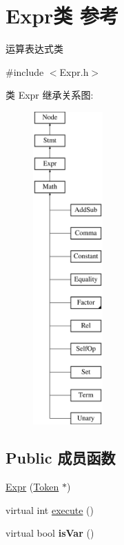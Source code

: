 \hypertarget{class_expr}{}\section{Expr类 参考}
\label{class_expr}


运算表达式类  




{\ttfamily \#include $<$Expr.\+h$>$}

类 Expr 继承关系图\+:\begin{figure}[H]
\begin{center}
\leavevmode
\includegraphics[height=12.000000cm]{class_expr}
\end{center}
\end{figure}
\subsection*{Public 成员函数}
\begin{DoxyCompactItemize}
\item 
\hyperlink{class_expr_a5a045d68e601c2e782e1958d55a07400}{Expr} (\hyperlink{class_token}{Token} $\ast$)
\item 
virtual int \hyperlink{class_expr_aff6a2e6eaa460e2a3db28ebdab089b51}{execute} ()
\item 
virtual bool {\bfseries is\+Var} ()\hypertarget{class_expr_add2b30644dd850c4bfa2d619d20d8c09}{}\label{class_expr_add2b30644dd850c4bfa2d619d20d8c09}

\end{DoxyCompactItemize}

